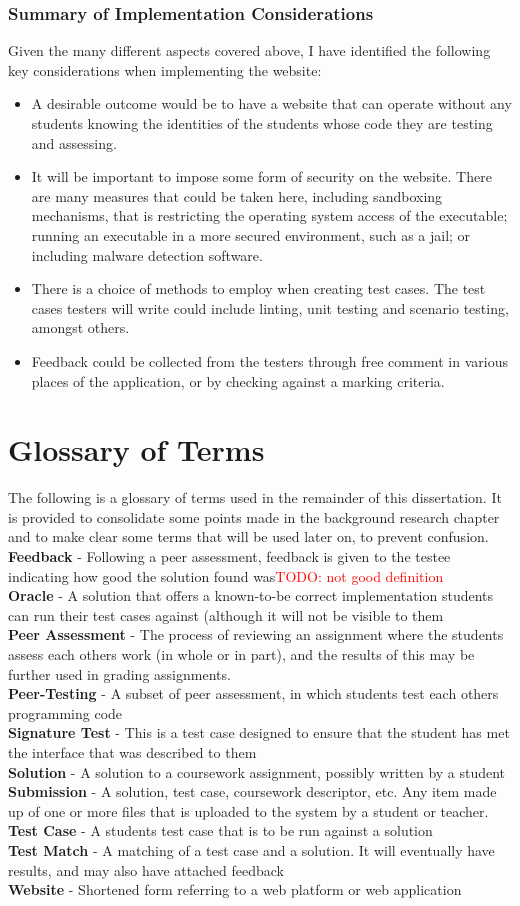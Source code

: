 \documentclass[a4paper,11pt]{report}
\newcommand{\todo}[1]{\textcolor{red}{TODO: #1}}
\newcommand{\gloss}[2]{\textbf{#1} - {#2}\\}
\begin{document}
\subsection{Summary of Implementation Considerations}
Given the many different aspects covered above, I have identified the following key considerations when implementing the website:
\begin{itemize}
 \item A desirable outcome would be to have a website that can operate without any students knowing the identities of the students whose code they are testing and assessing.
 \item It will be important to impose some form of security on the website. There are many measures that could be taken here, including sandboxing mechanisms, that is restricting the operating system access of the executable; running an executable in a more secured environment, such as a jail; or including malware detection software.
 \item There is a choice of methods to employ when creating test cases. The test cases testers will write could include linting, unit testing and scenario testing, amongst others.
 \item Feedback could be collected from the testers through free comment in various places of the application, or by checking against a marking criteria.
\end{itemize}


\chapter{Glossary of Terms}
The following is a glossary of terms used in the remainder of this dissertation. It is provided to consolidate some points made in the background research chapter and to make clear some terms that will be used later on, to prevent confusion.\\
\gloss{Feedback}{Following a peer assessment, feedback is given to the testee indicating how good the solution found was\todo{not good definition}}
\gloss{Oracle}{A solution that offers a known-to-be correct implementation students can run their test cases against (although it will not be visible to them}
\gloss{Peer Assessment}{The process of reviewing an assignment where the students assess each others work (in whole or in part), and the results of this may be further used in grading assignments.}
\gloss{Peer-Testing}{A subset of peer assessment, in which students test each others programming code}
\gloss{Signature Test}{This is a test case designed to ensure that the student has met the interface that was described to them}
\gloss{Solution}{A solution to a coursework assignment, possibly written by a student}
\gloss{Submission}{A solution, test case, coursework descriptor, etc. Any item made up of one or more files that is uploaded to the system by a student or teacher.}
\gloss{Test Case}{A students test case that is to be run against a solution}
\gloss{Test Match}{A matching of a test case and a solution. It will eventually have results, and may also have attached feedback}
\gloss{Website}{Shortened form referring to a web platform or web application}
\end{document}
